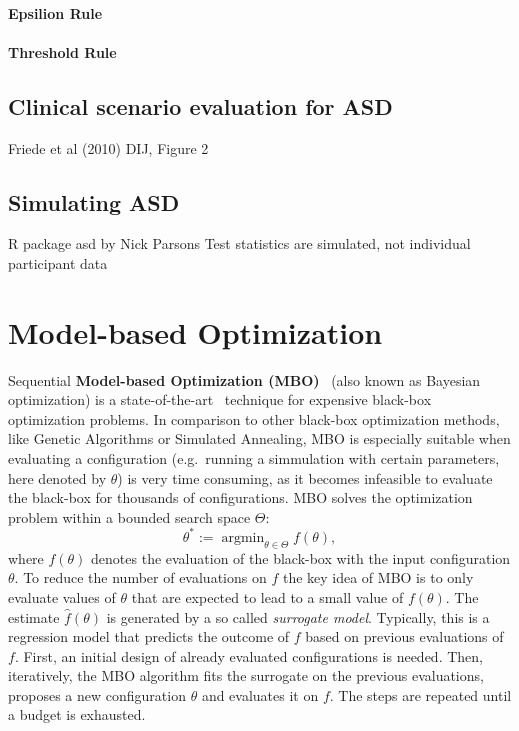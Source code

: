 \documentclass[bimj,fleqn]{w-art}
\theoremstyle{plain}
\theoremstyle{definition}
\begin{document}
\paragraph{Epsilion Rule}

\paragraph{Threshold Rule}

\subsection{Clinical scenario evaluation for ASD}
Friede et al (2010) DIJ, Figure 2

\subsection{Simulating ASD}
R package asd by Nick Parsons
Test statistics are simulated, not individual participant data

\section{Model-based Optimization}

Sequential \textbf{Model-based Optimization (MBO)}~\citep{jones_taxonomy_2001} (also known as Bayesian optimization) is a state-of-the-art~\citep{shahriari_taking_2016} technique for expensive black-box optimization problems.
In comparison to other black-box optimization methods, like Genetic Algorithms or Simulated Annealing, MBO is especially suitable when evaluating a configuration (e.g.\ running a simmulation with certain parameters, here denoted by $\theta$) is very time consuming, as it becomes infeasible to evaluate the black-box for thousands of configurations.
MBO solves the optimization problem within a bounded search space $\Theta$:
\[
\theta^\ast := \operatorname{argmin}_{\theta \in \Theta} f(\theta),
\]
where $f(\theta)$ denotes the evaluation of the black-box with the input configuration $\theta$.
To reduce the number of evaluations on $f$ the key idea of MBO is to only evaluate values of $\theta$ that are expected to lead to a small value of $f(\theta)$.
The estimate $\hat{f}(\theta)$ is generated by a so called \emph{surrogate model}.
Typically, this is a regression model that predicts the outcome of $f$ based on previous evaluations of $f$.
First, an initial design of already evaluated configurations is needed.
Then, iteratively, the MBO algorithm fits the surrogate on the previous evaluations, proposes a new configuration $\theta$ and evaluates it on $f$.
The steps are repeated until a budget is exhausted.
\end{document}
